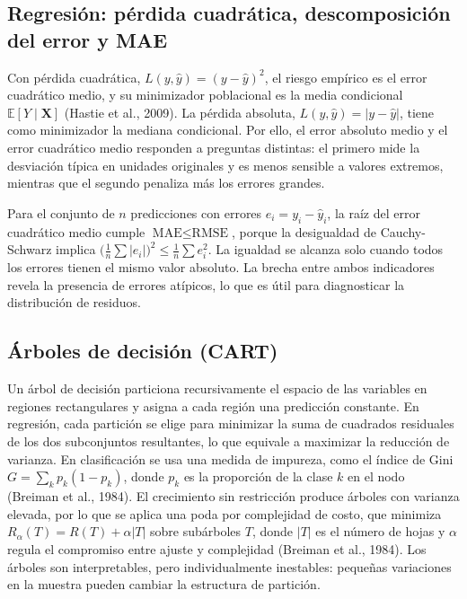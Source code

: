 \subsection{Regresión: pérdida cuadrática, descomposición del error y MAE}
Con pérdida cuadrática, $L(y,\hat{y})=(y-\hat{y})^2$, el riesgo empírico es el error cuadrático medio, y su minimizador poblacional es la media condicional $\mathbb{E}[Y\mid\mathbf{X}]$ (Hastie et al., 2009). La pérdida absoluta, $L(y,\hat{y})=|y-\hat{y}|$, tiene como minimizador la mediana condicional. Por ello, el error absoluto medio y el error cuadrático medio responden a preguntas distintas: el primero mide la desviación típica en unidades originales y es menos sensible a valores extremos, mientras que el segundo penaliza más los errores grandes.

Para el conjunto de $n$ predicciones con errores $e_i=y_i-\hat{y}_i$, la raíz del error cuadrático medio cumple $\text{MAE} \leq \text{RMSE}$, porque la desigualdad de Cauchy-Schwarz implica $\big(\tfrac{1}{n}\sum|e_i|\big)^2 \leq \tfrac{1}{n}\sum e_i^2$. La igualdad se alcanza solo cuando todos los errores tienen el mismo valor absoluto. La brecha entre ambos indicadores revela la presencia de errores atípicos, lo que es útil para diagnosticar la distribución de residuos.

\subsection{Árboles de decisión (CART)}
Un árbol de decisión particiona recursivamente el espacio de las variables en regiones rectangulares y asigna a cada región una predicción constante. En regresión, cada partición se elige para minimizar la suma de cuadrados residuales de los dos subconjuntos resultantes, lo que equivale a maximizar la reducción de varianza. En clasificación se usa una medida de impureza, como el índice de Gini $G=\sum_k p_k(1-p_k)$, donde $p_k$ es la proporción de la clase $k$ en el nodo (Breiman et al., 1984). El crecimiento sin restricción produce árboles con varianza elevada, por lo que se aplica una poda por complejidad de costo, que minimiza $R_\alpha(T)=R(T)+\alpha|T|$ sobre subárboles $T$, donde $|T|$ es el número de hojas y $\alpha$ regula el compromiso entre ajuste y complejidad (Breiman et al., 1984). Los árboles son interpretables, pero individualmente inestables: pequeñas variaciones en la muestra pueden cambiar la estructura de partición.

